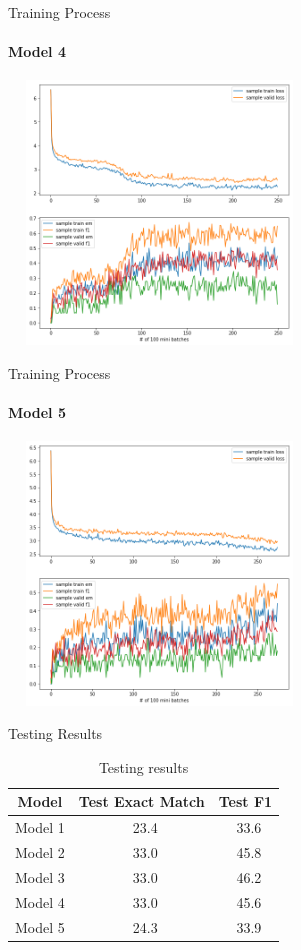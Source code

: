 \documentclass{beamer}
\begin{document}
\begin{frame}{Training Process}\framesubtitle{Model 4}
    \begin{center}
        \includegraphics[width=8cm, height=7cm]{figures/match_change2.png}
    \end{center}

\end{frame}

\begin{frame}{Training Process}\framesubtitle{Model 5}
    \begin{center}
        \includegraphics[width=8cm, height=7cm]{figures/match_change3.png}
    \end{center}

\end{frame}

\begin{frame}{Testing Results}
    \begin{table}[htbp]\centering
      \caption{Testing results}
      \label{tab:test_results}
      \begin{tabular}{|c|c|c|}
        \hline
        Model& Test Exact Match & Test F1 \\
        \hline\hline
        Model 1 & \ 23.4 &\ 33.6 \\
        Model 2 & \ 33.0 &\ 45.8 \\
        Model 3 & \ 33.0 &\ 46.2 \\
        Model 4 & \ 33.0 &\ 45.6 \\
        Model 5 & \ 24.3 &\ 33.9 \\
        \hline
      \end{tabular}
    \end{table}
\end{frame}
\end{document}
